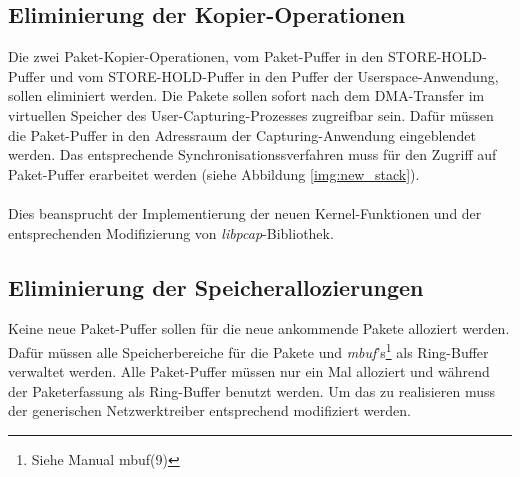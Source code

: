 \subsection{Eliminierung der Kopier-Operationen}
Die zwei Paket-Kopier-Operationen, vom Paket-Puffer in den STORE-HOLD-Puffer
und vom STORE-HOLD-Puffer in den Puffer der Userspace-Anwendung, sollen
eliminiert werden.  Die Pakete sollen sofort nach dem DMA-Transfer im
virtuellen Speicher des User-Capturing-Prozesses zugreifbar sein. Dafür müssen
die Paket-Puffer in den Adressraum der Capturing-Anwendung eingeblendet werden.
Das entsprechende Synchronisationssverfahren muss für den Zugriff auf
Paket-Puffer erarbeitet werden (siehe Abbildung \ref{img:new_stack}).\\\\
Dies beansprucht der Implementierung der neuen Kernel-Funktionen und der
entsprechenden Modifizierung von \emph{libpcap}-Bibliothek. 
%
\subsection{Eliminierung der Speicherallozierungen}
Keine neue Paket-Puffer sollen für die neue ankommende Pakete alloziert werden.
Dafür müssen alle Speicherbereiche für die Pakete und
\emph{mbuf}'s\footnote{Siehe Manual mbuf(9)} als Ring-Buffer verwaltet werden.
Alle Paket-Puffer müssen nur ein Mal alloziert und während der Paketerfassung
als Ring-Buffer benutzt werden. Um das zu realisieren muss der generischen
Netzwerktreiber entsprechend modifiziert werden.
